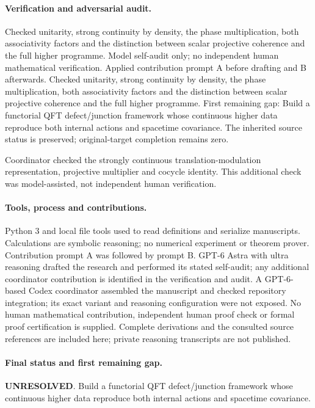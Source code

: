 \documentclass[11pt]{article}
\begin{document}
\paragraph{Verification and adversarial audit.}
Checked unitarity, strong continuity by density, the phase multiplication, both associativity factors and the distinction between scalar projective coherence and the full higher programme. Model self-audit only; no independent human mathematical verification. Applied contribution prompt A before drafting and B afterwards. Checked unitarity, strong continuity by density, the phase multiplication, both associativity factors and the distinction between scalar projective coherence and the full higher programme. First remaining gap: Build a functorial QFT defect/junction framework whose continuous higher data reproduce both internal actions and spacetime covariance. The inherited source status is preserved; original-target completion remains zero.

Coordinator checked the strongly continuous translation-modulation representation, projective multiplier and cocycle identity. This additional check was model-assisted, not independent human verification.

\paragraph{Tools, process and contributions.}
Python 3 and local file tools used to read definitions and serialize manuscripts. Calculations are symbolic reasoning; no numerical experiment or theorem prover. Contribution prompt A was followed by prompt B. GPT-6 Astra with ultra reasoning drafted the research and performed its stated self-audit; any additional coordinator contribution is identified in the verification and audit. A GPT-6-based Codex coordinator assembled the manuscript and checked repository integration; its exact variant and reasoning configuration were not exposed. No human mathematical contribution, independent human proof check or formal proof certification is supplied. Complete derivations and the consulted source references are included here; private reasoning transcripts are not published.

\paragraph{Final status and first remaining gap.}
\textbf{UNRESOLVED}. Build a functorial QFT defect/junction framework whose continuous higher data reproduce both internal actions and spacetime covariance.
\end{document}
